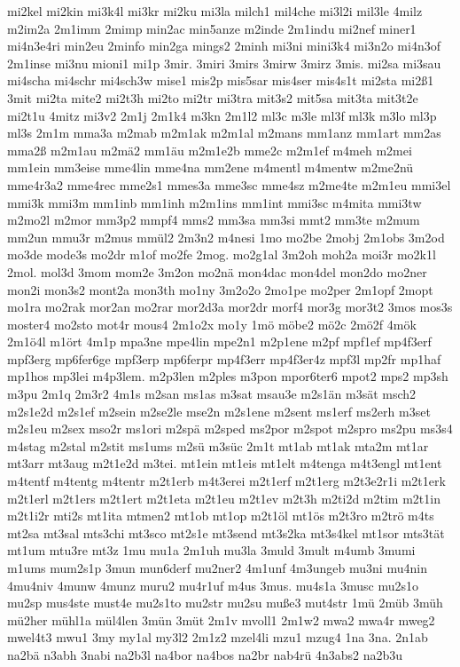 {mi2kel
mi2kin
mi3k4l
mi3kr
mi2ku
mi3la
milch1
mil4che
mi3l2i
mil3le
4milz
m2im2a
2m1imm
2mimp
min2ac
min5anze
m2inde
2m1indu
mi2nef
miner1
mi4n3e4ri
min2eu
2minfo
min2ga
mings2
2minh
mi3ni
mini3k4
mi3n2o
mi4n3of
2m1inse
mi3nu
mioni1
mi1p
3mir.
3miri
3mirs
3mirw
3mirz
3mis.
mi2sa
mi3sau
mi4scha
mi4schr
mi4sch3w
mise1
mis2p
mis5sar
mis4ser
mis4s1t
mi2sta
mi2ß1
3mit
mi2ta
mite2
mi2t3h
mi2to
mi2tr
mi3tra
mit3s2
mit5sa
mit3ta
mit3t2e
mi2t1u
4mitz
mi3v2
2m1j
2m1k4
m3kn
2m1l2
ml3c
m3le
ml3f
ml3k
m3lo
ml3p
ml3s
2m1m
mma3a
m2mab
m2m1ak
m2m1al
m2mans
mm1anz
mm1art
mm2as
mma2ß
m2m1au
m2mä2
mm1äu
m2m1e2b
mme2c
m2m1ef
m4meh
m2mei
mm1ein
mm3eise
mme4lin
mme4na
mm2ene
m4mentl
m4mentw
m2me2nü
mme4r3a2
mme4rec
mme2s1
mmes3a
mme3sc
mme4sz
m2me4te
m2m1eu
mmi3el
mmi3k
mmi3m
mm1inb
mm1inh
m2m1ins
mm1int
mmi3sc
m4mita
mmi3tw
m2mo2l
m2mor
mm3p2
mmpf4
mms2
mm3sa
mm3si
mmt2
mm3te
m2mum
mm2un
mmu3r
m2mus
mmül2
2m3n2
m4nesi
1mo
mo2be
2mobj
2m1obs
3m2od
mo3de
mode3s
mo2dr
m1of
mo2fe
2mog.
mo2g1al
3m2oh
moh2a
moi3r
mo2k1l
2mol.
mol3d
3mom
mom2e
3m2on
mo2nä
mon4dac
mon4del
mon2do
mo2ner
mon2i
mon3s2
mont2a
mon3th
mo1ny
3m2o2o
2mo1pe
mo2per
2m1opf
2mopt
mo1ra
mo2rak
mor2an
mo2rar
mor2d3a
mor2dr
morf4
mor3g
mor3t2
3mos
mos3s
moster4
mo2sto
mot4r
mous4
2m1o2x
mo1y
1mö
möbe2
mö2c
2mö2f
4mök
2m1ö4l
m1ört
4m1p
mpa3ne
mpe4lin
mpe2n1
m2p1ene
m2pf
mpf1ef
mp4f3erf
mpf3erg
mp6fer6ge
mpf3erp
mp6ferpr
mp4f3err
mp4f3er4z
mpf3l
mp2fr
mp1haf
mp1hos
mp3lei
m4p3lem.
m2p3len
m2ples
m3pon
mpor6ter6
mpot2
mps2
mp3sh
m3pu
2m1q
2m3r2
4m1s
m2san
ms1as
m3sat
msau3e
m2s1än
m3sät
msch2
m2s1e2d
m2s1ef
m2sein
m2se2le
mse2n
m2s1ene
m2sent
ms1erf
ms2erh
m3set
m2s1eu
m2sex
mso2r
ms1ori
m2spä
m2sped
ms2por
m2spot
m2spro
ms2pu
ms3s4
m4stag
m2stal
m2stit
ms1ums
m2sü
m3süc
2m1t
mt1ab
mt1ak
mta2m
mt1ar
mt3arr
mt3aug
m2t1e2d
m3tei.
mt1ein
mt1eis
mt1elt
m4tenga
m4t3engl
mt1ent
m4tentf
m4tentg
m4tentr
m2t1erb
m4t3erei
m2t1erf
m2t1erg
m2t3e2r1i
m2t1erk
m2t1erl
m2t1ers
m2t1ert
m2t1eta
m2t1eu
m2t1ev
m2t3h
m2ti2d
m2tim
m2t1in
m2t1i2r
mti2s
mt1ita
mtmen2
mt1ob
mt1op
m2t1öl
mt1ös
m2t3ro
m2trö
m4ts
mt2sa
mt3sal
mts3chi
mt3sco
mt2s1e
mt3send
mt3s2ka
mt3s4kel
mt1sor
mts3tät
mt1um
mtu3re
mt3z
1mu
mu1a
2m1uh
mu3la
3muld
3mult
m4umb
3mumi
m1ums
mum2s1p
3mun
mun6derf
mu2ner2
4m1unf
4m3ungeb
mu3ni
mu4nin
4mu4niv
4munw
4munz
muru2
mu4r1uf
m4us
3mus.
mu4s1a
3musc
mu2s1o
mu2sp
mus4ste
must4e
mu2s1to
mu2str
mu2su
muße3
mut4str
1mü
2müb
3müh
mü2her
mühl1a
mül4len
3mün
3müt
2m1v
mvoll1
2m1w2
mwa2
mwa4r
mweg2
mwel4t3
mwu1
3my
my1al
my3l2
2m1z2
mzel4li
mzu1
mzug4
1na
3na.
2n1ab
na2bä
n3abh
3nabi
na2b3l
na4bor
na4bos
na2br
nab4rü
4n3abs2
na2b3u
}
